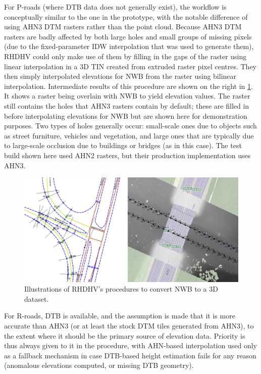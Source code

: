 For P-roads (where DTB data does not generally exist), the workflow is conceptually similar to the one in the prototype, with the notable difference of using AHN3 DTM rasters rather than the point cloud. Because AHN3 DTM rasters are badly affected by both large holes and small groups of missing pixels (due to the fixed-parameter IDW interpolation that was used to generate them), RHDHV could only make use of them by filling in the gaps of the raster using linear interpolation in a 3D TIN created from extruded raster pixel centres. They then simply interpolated elevations for NWB from the raster using bilinear interpolation. Intermediate results of this procedure are shown on the right in \ref{fig:rhdhv}. It shows a raster being overlain with NWB to yield elevation values. The raster still contains the holes that AHN3 rasters contain by default; these are filled in before interpolating elevations for NWB but are shown here for demonstration purposes. Two types of holes generally occur: small-scale ones due to objects such as street furniture, vehicles and vegetation, and large ones that are typically due to large-scale occlusion due to buildings or bridges (as in this case). The test build shown here used AHN2 rasters, but their production implementation uses AHN3.

\begin{figure}
    \centering
    \includegraphics[width=\linewidth]{final_report/figs/rhdhv_combined.png}
    \caption{Illustrations of RHDHV's procedures to convert NWB to a 3D dataset.}
    \label{fig:rhdhv}
\end{figure}

For R-roads, DTB is available, and the assumption is made that it is more accurate than AHN3 (or at least the stock DTM tiles generated from AHN3), to the extent where it should be the primary source of elevation data. Priority is thus always given to it in the procedure, with AHN-based interpolation used only as a fallback mechanism in case DTB-based height estimation fails for any reason (anomalous elevations computed, or missing DTB geometry).

